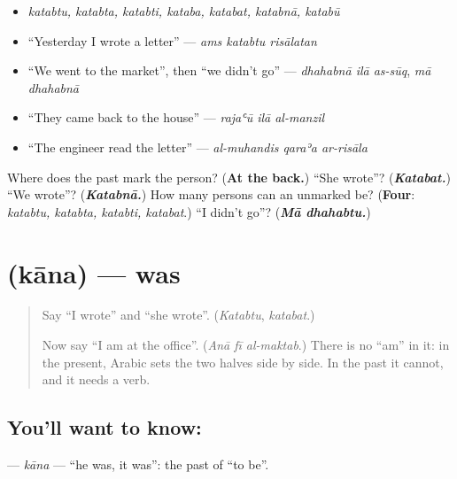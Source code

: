 \begin{itemize}
\raggedright
  \item \emph{katabtu, katabta, katabti, kataba, katabat, katabnā, katabū}
  \item \textquotedblleft{}Yesterday I wrote a letter\textquotedblright{} — \emph{ams katabtu risālatan}
  \item \textquotedblleft{}We went to the market\textquotedblright{}, then \textquotedblleft{}we didn't go\textquotedblright{} — \emph{dhahabnā ilā as-sūq}, \emph{mā dhahabnā}
  \item \textquotedblleft{}They came back to the house\textquotedblright{} — \emph{rajaʿū ilā al-manzil}
  \item \textquotedblleft{}The engineer read the letter\textquotedblright{} — \emph{al-muhandis qaraʾa ar-risāla}
\end{itemize}

\begin{tcolorbox}[breakable,colback=teal!4,colframe=teal!35!black,title={Before you move on}]
Where does the past mark the person? (\textbf{At the back.}) \textquotedblleft{}She wrote\textquotedblright{}? (\emph{\textbf{Katabat.}}) \textquotedblleft{}We wrote\textquotedblright{}? (\emph{\textbf{Katabnā.}}) How many persons can an unmarked \textbf{} be? (\textbf{Four}: \emph{katabtu, katabta, katabti, katabat}.) \textquotedblleft{}I didn't go\textquotedblright{}? (\emph{\textbf{Mā dhahabtu.}})
\end{tcolorbox}
\section[\texorpdfstring{\ar{كان} (kāna)}{كان (kāna)}]{ (kāna) — was}

\label{lesson:AR-C283-kana}



\begin{quote}
Say \textquotedblleft{}I wrote\textquotedblright{} and \textquotedblleft{}she wrote\textquotedblright{}. (\emph{Katabtu}, \emph{katabat}.)

Now say \textquotedblleft{}I am at the office\textquotedblright{}. (\emph{Anā fī al-maktab}.) There is no \textquotedblleft{}am\textquotedblright{} in it: in the present, Arabic sets the two halves side by side. In the past it cannot, and it needs a verb.
\end{quote}

\subsection*{You'll want to know: }
\textbf{} — \emph{kāna} — \textquotedblleft{}he was, it was\textquotedblright{}: the past of \textquotedblleft{}to be\textquotedblright{}.

